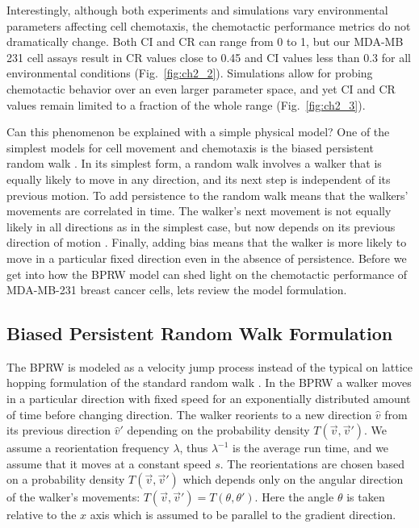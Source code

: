 Interestingly, although both experiments and simulations vary environmental parameters affecting cell chemotaxis, the chemotactic performance metrics do not dramatically change. Both CI and CR can range from 0 to 1, but our MDA-MB 231 cell assays result in CR values close to 0.45 and CI values less than 0.3 for all environmental conditions (Fig.\ \ref{fig:ch2_2}). Simulations allow for probing chemotactic behavior over an even larger parameter space, and yet CI and CR values remain limited to a fraction of the whole range (Fig.\ \ref{fig:ch2_3}).

Can this phenomenon be explained with a simple physical model? One of the simplest models for cell movement and chemotaxis is the biased persistent random walk \cite{alt1980biased,othmer1988models}. In its simplest form, a random walk involves a walker that is equally likely to move in any direction, and its next step is independent of its previous motion. To add persistence to the random walk means that the walkers' movements are correlated in time. The walker's next movement is not equally likely in all directions as in the simplest case, but now depends on its previous direction of motion \cite{patlak1953random}. Finally, adding bias means that the walker is more likely to move in a particular fixed direction even in the absence of persistence.
Before we get into how the BPRW model can shed light on the chemotactic performance of MDA-MB-231 breast cancer cells, lets review the model formulation.

\subsection{Biased Persistent Random Walk Formulation}

The BPRW is modeled as a velocity jump process instead of the typical on lattice hopping formulation of the standard random walk \cite{othmer1988models}. In the BPRW a walker moves in a particular direction with fixed speed for an exponentially distributed amount of time before changing direction. The walker reorients to a new direction $\hat{v}$ from its previous direction $\hat{v}'$ depending on the probability density $T(\vec{v},\vec{v}')$. We assume a reorientation frequency $\lambda$, thus $\lambda^{-1}$ is the average run time, and we assume that it moves at a constant speed $s$. The reorientations are chosen based on a probability density $T(\vec{v},\vec{v}')$ which depends only on the angular direction of the walker's movements: $T(\vec{v},\vec{v}') = T(\theta,\theta')$. Here the angle $\theta$ is taken relative to the $x$ axis which is assumed to be parallel to the gradient direction.

